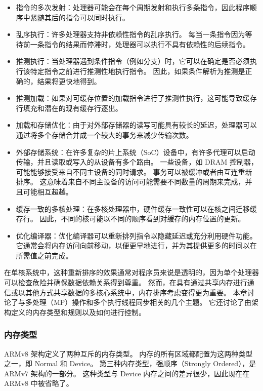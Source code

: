 \begin{itemize}
\item
  指令的多次发射：处理器可能会在每个周期发射和执行多条指令，因此程序顺序中紧随其后的指令可以同时执行。
\item
  乱序执行：许多处理器支持非依赖性指令的乱序执行。
  每当一条指令因为等待前一条指令的结果而停滞时，处理器可以执行不具有依赖性的后续指令。
\item
  推测执行：当处理器遇到条件指令（例如分支）时，它可以在确定是否必须执行该特定指令之前进行推测性地执行指令。
  因此，如果条件解析为推测是正确的，结果将更快地得到。
\item
  推测加载：如果对可缓存位置的加载指令进行了推测性执行，这可能导致缓存行填充和潜在的现有缓存行逐出。
\item
  加载和存储优化：由于对外部存储器的读写可能具有较长的延迟，处理器可以通过将多个存储合并成一个较大的事务来减少传输次数。
\item
  外部存储系统：在许多复杂的片上系统（SoC）设备中，有许多代理可以启动传输，并且读取或写入的从设备有多个路由。
  一些设备，如 DRAM 控制器，可能能够接受来自不同主设备的同时请求。
  事务可以被缓冲或者由互连重新排序。
  这意味着来自不同主设备的访问可能需要不同数量的周期来完成，并且可能相互超越。
\item
  缓存一致的多核处理：在多核处理器中，硬件缓存一致性可以在核之间迁移缓存行。
  因此，不同的核可能以不同的顺序看到对缓存的内存位置的更新。
\item
  优化编译器：优化编译器可以重新排列指令以隐藏延迟或充分利用硬件功能。
  它通常会将内存访问向前移动，以便更早地进行，并为其提供更多的时间以在所需值之前完成。
\end{itemize}

在单核系统中，这种重新排序的效果通常对程序员来说是透明的，因为单个处理器可以检查危险并确保数据依赖关系得到尊重。
然而，在具有通过共享内存进行通信或以其他方式共享数据的多核心系统中，内存排序考虑变得更为重要。
本章讨论了与多处理（MP）操作和多个执行线程同步相关的几个主题。
它还讨论了由架构定义的内存类型和规则以及如何进行控制。

\subsubsection{内存类型}

ARMv8 架构定义了两种互斥的内存类型。
内存的所有区域都配置为这两种类型之一，即 Normal 和 Device。
第三种内存类型，强顺序（Strongly Ordered），是 ARMv7 架构的一部分。
这种类型与 Device 内存之间的差异很少，因此现在在 ARMv8 中被省略了。

